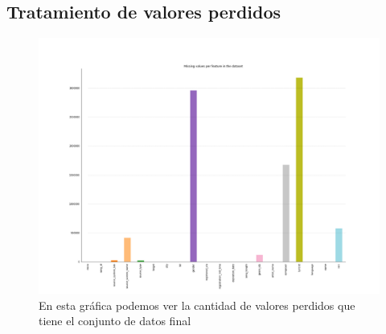 \documentclass[a4paper]{article}
\begin{document}
\subsection{Tratamiento de valores perdidos}


\begin{figure}[H]
\centering
\includegraphics[width=1\textwidth]{Images/missings.png}
\caption{En esta gráfica podemos ver la cantidad de valores perdidos que tiene el conjunto de datos final}
\end{figure}
\end{document}
